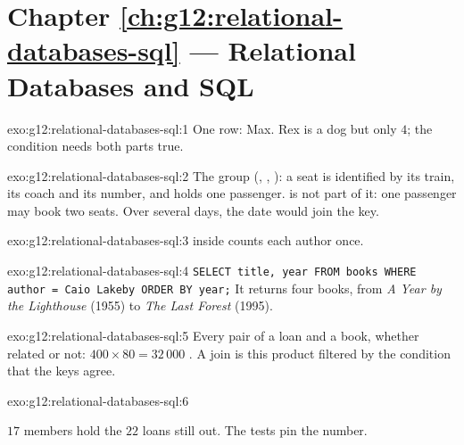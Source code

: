 \section*{Chapter \ref{ch:g12:relational-databases-sql} --- Relational Databases and SQL}

\begin{solution}{exo:g12:relational-databases-sql:1}
One row: Max. Rex is a dog but only $4$; the condition needs both parts true.
\end{solution}

\begin{solution}{exo:g12:relational-databases-sql:2}
The group (, , ): a seat is identified by its train, its coach and its number, and
holds one passenger.  is not part of it: one passenger may book two seats. Over several days, the date
would join the key.
\end{solution}

\begin{solution}{exo:g12:relational-databases-sql:3}
  inside  counts each author once.
\end{solution}

\begin{solution}{exo:g12:relational-databases-sql:4}
\texttt{SELECT title, year FROM books WHERE author = \textquotesingle{}Caio Lakeby\textquotesingle{} ORDER BY year;} It returns four books, from
\emph{A Year by the Lighthouse} (1955) to \emph{The Last Forest} (1995).
\end{solution}

\begin{solution}{exo:g12:relational-databases-sql:5}
Every pair of a loan and a book, whether related or not: $400 \times 80 = 32\,000$ . A join is this product
filtered by the condition that the keys agree.
\end{solution}

\begin{solution}{exo:g12:relational-databases-sql:6}
\smallskip\noindent\hspace*{2em}

\noindent\hspace*{2em}

\noindent\hspace*{4em}

\noindent\hspace*{2em}

\smallskip\noindent $17$ members hold the $22$ loans still out. The tests pin the number.
\end{solution}

